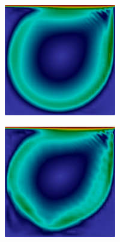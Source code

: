 \begin{figure}[h!]
\begin{subfigure}{\textwidth}
\begin{subfigure}{\textwidth}
\begin{subfigure}{.32\textwidth}
            \end{subfigure}
            \begin{subfigure}{.32\textwidth}
                \includegraphics[width=\linewidth]{Figuras/cavity-poor/LES-Qua.png}
            \end{subfigure}
            \begin{subfigure}{.32\textwidth}
                \includegraphics[width=\linewidth]{Figuras/cavity-poor/LES-TH.png}

\end{subfigure}
\end{subfigure}
\end{subfigure}
\end{figure}
